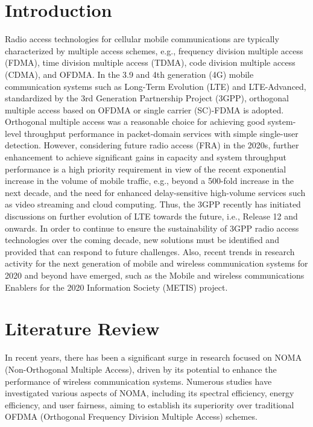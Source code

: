 \documentclass[conference]{IEEEtran}
\begin{document}
\section{Introduction}
Radio access technologies for cellular mobile communications are typically characterized by multiple access schemes, e.g., frequency division multiple access (FDMA), time division multiple access (TDMA), code division multiple access (CDMA), and OFDMA. In the 3.9 and 4th generation (4G) mobile communication systems such as Long-Term Evolution (LTE)  and LTE-Advanced, standardized by the 3rd Generation Partnership Project (3GPP), orthogonal multiple access based on OFDMA \cite{yin2006ofdma} or single carrier (SC)-FDMA is adopted. Orthogonal multiple access was a reasonable choice for achieving good system-level throughput performance in packet-domain services with simple single-user detection. However, considering future radio access (FRA) in the 2020s, further enhancement to achieve significant gains in capacity and 
system throughput performance is a high priority requirement in view of the recent exponential increase in the volume of mobile traffic, e.g., 
beyond a 500-fold increase in the next decade, and the need for enhanced delay-sensitive high-volume services such as video streaming and cloud computing. \cite{makki2020survey} Thus, the 3GPP recently has initiated discussions on further evolution of LTE towards the future, i.e., Release 12 and onwards. In order to continue to ensure the sustainability of 3GPP radio access technologies over the coming decade, new solutions must be identified and provided that can respond to future challenges. Also, recent trends in research activity for the next generation of mobile and wireless communication systems for 2020 and beyond have emerged, such as the Mobile and wireless communications Enablers for the 2020 Information Society (METIS) project.

\section{Literature Review}
In recent years, there has been a significant surge in research focused on NOMA (Non-Orthogonal Multiple Access), driven by its potential to enhance the performance of wireless communication systems. Numerous studies have investigated various aspects of NOMA, including its spectral efficiency, energy efficiency, and user fairness, aiming to establish its superiority over traditional OFDMA (Orthogonal Frequency Division Multiple Access) schemes.
\end{document}
